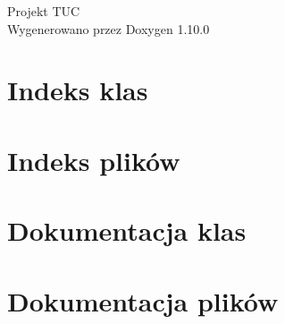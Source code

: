 \documentclass[twoside]{book}
\newcommand{\+}{\discretionary{\mbox{\scriptsize$\hookleftarrow$}}{}{}}
\newcommand{\clearemptydoublepage}{%
    \newpage{\pagestyle{empty}\cleardoublepage}%
  }
\begin{document}
  \raggedbottom
    \hypersetup{pageanchor=false,
                bookmarksnumbered=true,
                pdfencoding=unicode
               }
  \begin{titlepage}
  \vspace*{7cm}
  \begin{center}%
  {\Large Projekt TUC}\\
  \vspace*{1cm}
  {\large Wygenerowano przez Doxygen 1.10.0}\\
  \end{center}
  \end{titlepage}
  \clearemptydoublepage
  \tableofcontents
  \clearemptydoublepage
  \hypersetup{pageanchor=true}
\chapter{Indeks klas}

\chapter{Indeks plików}

\chapter{Dokumentacja klas}


\chapter{Dokumentacja plików}






  \backmatter
  \newpage
  \clearemptydoublepage
  \printindex
\end{document}
